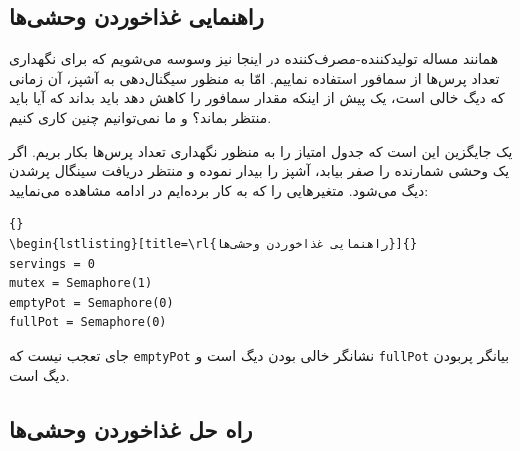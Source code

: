 \documentclass{book}
\newcommand{\clearemptydoublepage}{\newpage\cleardoublepage}
\begin{document}
\subsection{راهنمایی غذاخوردن وحشی‌ها}

    همانند مساله تولیدکننده-مصرف‌کننده  در اینجا نیز وسوسه می‌شویم که برای نگهداری تعداد پرس‌ها از سمافور استفاده نماییم. 
    امّا به منظور سیگنال‌دهی به آشپز،‌ آن زمانی که دیگ خالی است، یک پیش از اینکه مقدار سمافور را کاهش دهد باید بداند که آیا باید منتظر بماند؟ و 
    ما نمی‌توانیم چنین کاری کنیم. 

    یک جایگزین این است که جدول امتیاز را به منظور نگهداری تعداد پرس‌ها بکار بریم. 
    اگر یک وحشی شمارنده را صفر بیابد، آشپز را بیدار نموده و منتظر دریافت سینگال پرشدن دیگ می‌شود. 
    متغیرهایی را که به کار برده‌ایم در ادامه مشاهده می‌نمایید:

\begin{latin}
\begin{latin}
\begin{lstlisting}[title={Dining Savages hint}]{}
\begin{lstlisting}[title=\rl{راهنمایی غذاخوردن وحشی‌ها}]{}
servings = 0
mutex = Semaphore(1)
emptyPot = Semaphore(0)
fullPot = Semaphore(0)
\end{lstlisting}
\end{latin}
\end{latin}

    جای تعجب نیست که {\tt emptyPot} نشانگر خالی بودن دیگ است و {\tt fullPot} بیانگر پربودن دیگ است. 

\clearemptydoublepage
\subsection{راه‌ حل غذاخوردن وحشی‌ها}
\end{document}
